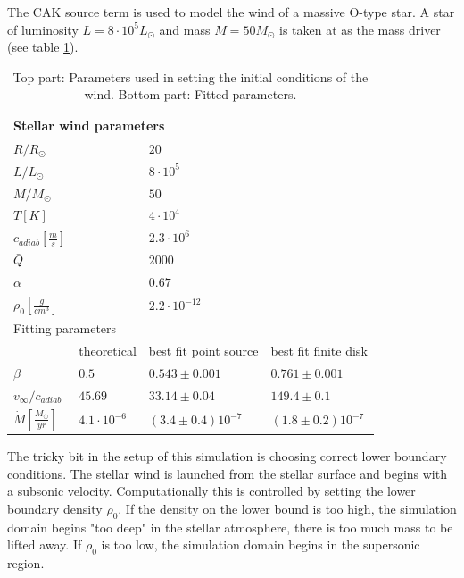 The CAK source term is used to model the wind of a massive O-type star. A star of luminosity $L = 8\cdot 10^5 L_\odot$ and mass $M = 50 M_\odot$ is taken at as the mass driver (see table \ref{tab: CAK_res}). \\

\begin{table}[]
\centering
\caption{Top part: Parameters used in setting the initial conditions of the wind. Bottom part: Fitted parameters.}
\label{tab: CAK_res}
\begin{tabular}{llll}
\hline
\hline
\multicolumn{4}{l}{Stellar wind parameters}                                           \\
\hline
$R/R_\odot$              &             & $20$ &\\
$L/L_\odot$              &             &  $8\cdot10^{5}$  &\\
$M/M_\odot$              &             & $50$ &\\
$T[K]$                   &             & $4\cdot10^{4}$ &\\
$c_{adiab}[\frac{m}{s}]$ &             & $2.3\cdot 10^{6}$ &\\
$\bar{Q}$ 				 &             & $2000$ &\\
$\alpha$                 &             & $0.67$ &\\
$\rho_0[\frac{g}{cm^3}]$ &             & $2.2\cdot 10^{-12}$ &\\
\hline
\hline
\multicolumn{4}{l}{Fitting parameters}                                                \\
                         & theoretical & best fit point source & best fit finite disk \\
\hline
$\beta$                  & $0.5$       & $0.543\pm 0.001$      &  $0.761 \pm 0.001$   \\
$v_{\infty}/c_{adiab}$   & $45.69$     & $33.14\pm 0.04$       &  $149.4 \pm 0.1$     \\
$\dot{M}[\frac{M_\odot}{yr}]$ & $4.1 \cdot 10^{-6}$  & $(3.4 \pm 0.4)10^{-7}$&  $(1.8\pm0.2)10^{-7}$ \\           
\end{tabular}
\end{table}




The tricky bit in the setup of this simulation is choosing correct lower boundary conditions. The stellar wind is launched from the stellar surface and begins with a subsonic velocity. Computationally this is controlled by setting the lower boundary density $\rho_0$. If the density on the lower bound is too high, the simulation domain begins "too deep" in the stellar atmosphere, there is too much mass to be lifted away. If $\rho_0$ is too low, the simulation domain begins in the supersonic region.\\

